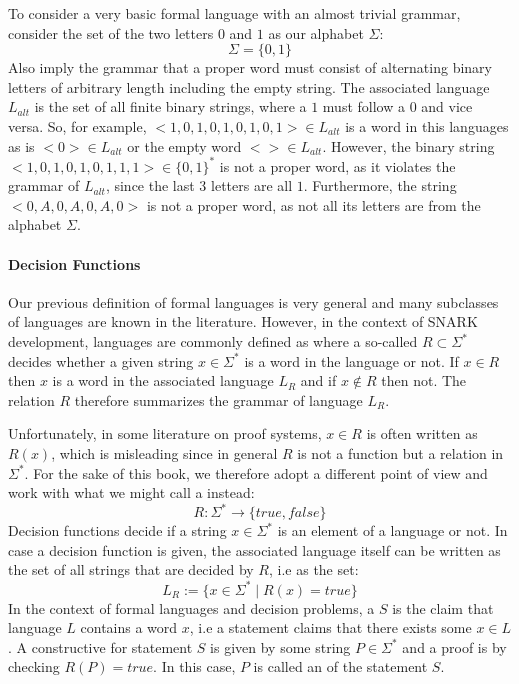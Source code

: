 \begin{example}
\label{ex:alternating_strings_lang}
To consider a very basic formal language with an almost trivial grammar, consider the set  of the two letters $0$ and $1$ as our alphabet $\Sigma$:
$$
\Sigma = \{0,1\}
$$
Also imply the grammar that a proper word must consist of alternating binary letters of arbitrary length including the empty string. The associated language $L_{alt}$ is the set of all finite binary strings, where a $1$ must follow a $0$ and vice versa. So, for example, $<1,0,1,0,1,0,1,0,1>\in L_{alt}$ is a word in this languages as is $<0>\in L_{alt}$ or the empty word $<>\in L_{alt}$. However, the binary string $<1,0,1,0,1,0,1,1,1>\in \{0,1\}^*$ is not a proper word, as it violates the grammar of $L_{alt}$, since the last 3 letters are all $1$. Furthermore, the string $<0,A,0,A,0,A,0>$ is not a proper word, as not all its letters are from the alphabet $\Sigma$. 
\end{example}

\paragraph{Decision Functions}
\label{sec:decision_function}
 Our previous definition of formal languages is very general and many subclasses of languages are known in the literature. However, in the context of SNARK development, languages are commonly defined as  where a so-called  $R\subset \Sigma^*$ decides whether a given string $x\in \Sigma^*$ is a word in the language or not. If $x\in R$ then $x$ is a word in the associated language $L_R$ and if $x\notin R$ then not. The relation $R$ therefore summarizes the grammar of language $L_R$.

Unfortunately, in some literature on proof systems, $x\in R$ is often written as $R(x)$, which is  misleading since in general $R$ is not a function but a relation in $\Sigma^*$. For the sake of this book, we therefore adopt a different point of view and work with what we might call a  instead:
\begin{equation}\label{eq:decision-function}
R: \Sigma^* \to \{true, false\}
\end{equation}
Decision functions decide if a string $x\in \Sigma^*$ is an element of a language or not. In case a decision function is given, the associated language itself can be written as the set of all strings that are decided by $R$, i.e as the set:
\begin{equation}
L_R := \{x\in \Sigma^*\;|\; R(x)=true\}
\end{equation}
In the context of formal languages and decision problems, a  $S$ is the claim that language $L$ contains a word $x$, i.e a statement claims that there exists some $x\in L$. A constructive  for statement $S$ is given by some string $P\in \Sigma^*$ and a proof is  by checking $R(P)=true$. In this case, $P$ is called an  of the statement $S$.

